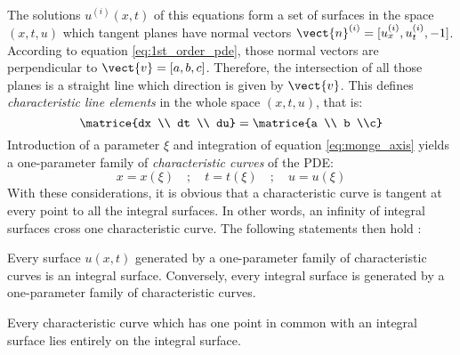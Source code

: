 The solutions $u^{(i)}(x,t)$ of this equations form a set of surfaces in the space $(x,t,u)$ which tangent planes have normal vectors $\vect{n}^{(i)}=[u^{(i)}_x,u^{(i)}_t,-1]$. According to equation \eqref{eq:1st_order_pde}, those normal vectors are perpendicular to $\vect{v}=[a,b,c]$. Therefore, the intersection of all those planes is a straight line which direction is given by $\vect{v}$. This defines \textit{characteristic line elements} in the whole space $(x,t,u)$, that is:
\begin{equation}
  \label{eq:monge_axis}
  \matrice{dx \\ dt \\ du} = \matrice{a \\ b \\c}
\end{equation}
Introduction of a parameter $\xi$ and integration of equation \eqref{eq:monge_axis} yields a one-parameter family of \textit{characteristic curves} of the PDE:
\begin{equation*}
  x=x(\xi) \quad ; \quad t=t(\xi) \quad ; \quad u=u(\xi)
\end{equation*}
With these considerations, it is obvious that a characteristic curve is tangent at every point to all the integral surfaces. In other words, an infinity of integral surfaces cross one characteristic curve. The following statements then hold \cite[p.63-64]{Courant}:
\begin{theorem}
  \label{th:integral_surface_generated}
  Every surface $u(x,t)$ generated by a one-parameter family of characteristic curves is an integral surface. Conversely, every integral surface is generated by a one-parameter family of characteristic curves.
\end{theorem}
\begin{theorem}
  \label{th:charac_in_integral_surface}
  Every characteristic curve which has one point in common with an integral surface lies entirely on the integral surface.
\end{theorem}

